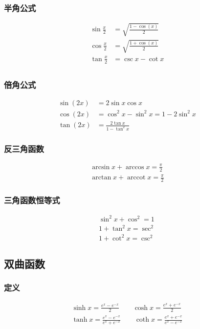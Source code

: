 \subsubsection{半角公式}
\begin{align}
    \sin\frac{x}{2}&=\sqrt{\frac{1-\cos(x)}{2}}\\
    \cos\frac{x}{2}&=\sqrt{\frac{1+\cos(x)}{2}}\\
    \tan\frac{x}{2}&=\csc x-\cot x \label{tan_.2}\\
\end{align}
\subsubsection{倍角公式}
\begin{align}
    \sin(2x)&=2\sin x\cos x\\
    \cos(2x)&=\cos^2x-\sin^2x=1-2\sin^2 x\\
    \tan(2x)&=\frac{2\tan x}{1-\tan^2x}
\end{align}
\subsubsection{反三角函数}
\begin{align}
    \arcsin x+\arccos x =\frac{\pi}{2}\\
    \arctan x+\operatorname{arccot}{x} =\frac{\pi}{2}
\end{align}
\subsubsection{三角函数恒等式}
\begin{align}
    \sin^2 x+\cos^2 =1\\
    1+\tan^2 x = \sec^2\\
    1+\cot^2 x = \csc^2
\end{align}

\subsection{双曲函数}
\subsubsection{定义}
\begin{align*}
    \sinh x = \frac{e^x-e^{-x}}{2}\qquad \cosh x = \frac{e^x+e^{-x}}{2}\\
    \tanh x = \frac{e^x-e^{-x}}{e^x+e^{-x}}\qquad \coth x = \frac{e^x+e^{-x}}{e^x-e^{-x}}
\end{align*}

